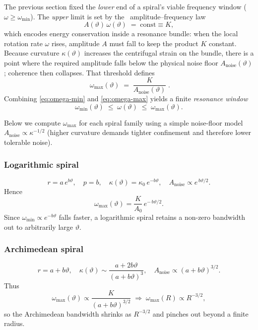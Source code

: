 The previous section fixed the \emph{lower} end of a spiral’s viable frequency window (\(\omega \ge \omega_{\min}\)). The \emph{upper} limit is set by the \RCM\ amplitude–frequency law
\begin{equation}
  A(\vartheta)\,\omega(\vartheta) \;=\; \text{const} \equiv K,
  \label{eq:amp-freq-law}
\end{equation}
which encodes energy conservation inside a resonance bundle: when the local rotation rate \(\omega\) rises, amplitude \(A\) must fall to keep the product \(K\) constant. Because curvature \(\kappa(\vartheta)\) increases the centrifugal strain on the bundle, there is a point where the required amplitude falls below the physical noise floor \(A_{\text{noise}}(\vartheta)\); coherence then collapses. That threshold defines
\begin{equation}
  \boxed{\;\omega_{\max}(\vartheta)
    \;=\; \frac{K}{A_{\text{noise}}(\vartheta)}\;}.
  \label{eq:omega-max}
\end{equation}
Combining \eqref{eq:omega-min} and \eqref{eq:omega-max} yields a finite \emph{resonance window}
\[
  \omega_{\min}(\vartheta)\;\le\;\omega(\vartheta)\;\le\;\omega_{\max}(\vartheta).
\]

Below we compute \(\omega_{\max}\) for each spiral family using a simple noise-floor model \(A_{\text{noise}}\propto\kappa^{-1/2}\) (higher curvature demands tighter confinement and therefore lower tolerable noise).

\subsubsection*{Logarithmic spiral}

\[
  r = a\,e^{b\vartheta}, \quad p=b,\quad
  \kappa(\vartheta)=\kappa_{0}\,e^{-b\vartheta},\quad
  A_{\text{noise}}\propto e^{\,b\vartheta/2}.
\]
Hence
\[
  \omega_{\max}(\vartheta)
  = \frac{K}{A_{0}}\,e^{-\,b\vartheta/2}.
\]
Since \(\omega_{\min}\propto e^{-b\vartheta}\) falls faster, a logarithmic spiral retains a non-zero bandwidth out to arbitrarily large \(\vartheta\).

\subsubsection*{Archimedean spiral}

\[
  r = a + b\vartheta,\quad
  \kappa(\vartheta)\sim\frac{a+2b\vartheta}{(a+b\vartheta)^{3}},\quad
  A_{\text{noise}}\propto(a+b\vartheta)^{3/2}.
\]
Thus
\[
  \omega_{\max}(\vartheta)
  \propto\frac{K}{(a+b\vartheta)^{3/2}}
  \;\Longrightarrow\;
  \omega_{\max}(R)\propto R^{-3/2},
\]
so the Archimedean bandwidth shrinks as \(R^{-3/2}\) and pinches out beyond a finite radius.

